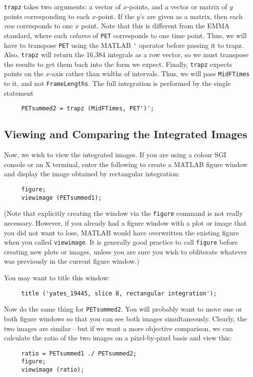 \verb|trapz| takes two arguments: a vector of $x$-points, and a vector
or matrix of $y$ points corresponding to each $x$-point.  If the $y$'s
are given as a matrix, then each {\em row} corresponds to one $x$
point.  Note that this is different from the EMMA standard, where each
{\em column} of \verb|PET| corresponds to one time point.  Thus, we
will have to transpose \verb|PET| using the MATLAB \verb|'| operator
before passing it to trapz.  Also, \verb|trapz| will return the 16,384
integrals as a row vector, so we must transpose the results to get
them back into the form we expect.  Finally, \verb|trapz| expects
points on the $x$-axis rather than widths of intervals.  Thus, we will
pass \verb|MidFTimes| to it, and not \verb|FrameLengths|.  The full
integration is performed by the single statement
\begin{verbatim}
     PETsummed2 = trapz (MidFTimes, PET')';
\end{verbatim}

\subsection{Viewing and Comparing the Integrated Images}

Now, we wish to view the integrated images.  If you are using a colour
SGI console or an X terminal, enter the following to create a MATLAB
figure window and display the image obtained by rectangular
integration:
\begin{verbatim}
     figure;
     viewimage (PETsummed1);
\end{verbatim}
(Note that explicitly creating the window via the \verb|figure|
command is not really necessary.  However, if you already had a
figure window with a plot or image that you did not want to lose,
MATLAB would have overwritten the existing figure when you called
\verb|viewimage|.  It is generally good practice to call
\verb|figure| before creating new plots or images, unless you are
sure you wish to obliterate whatever was previously in the current
figure window.)

You may want to title this window:
\begin{verbatim}
     title ('yates_19445, slice 8, rectangular integration');
\end{verbatim}

Now do the same thing for \verb|PETsummed2|.  You will probably want
to move one or both figure windows so that you can see both images
simultaneously.  Clearly, the two images are similar---but if we want
a more objective comparison, we can calculate the ratio of the two
images on a pixel-by-pixel basis and view this:
\begin{verbatim}
     ratio = PETsummed1 ./ PETsummed2;
     figure;
     viewimage (ratio);
\end{verbatim}

